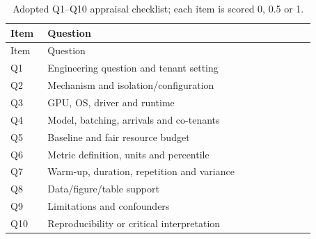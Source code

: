 \begin{longtable}{P{0.1\linewidth}P{0.77\linewidth}}
\caption{Adopted Q1--Q10 appraisal checklist; each item is scored 0, 0.5 or 1.}\\
\toprule Item & Question\\\midrule\endfirsthead
\toprule Item & Question\\\midrule\endhead
Q1 & Engineering question and tenant setting\\
Q2 & Mechanism and isolation/configuration\\
Q3 & GPU, OS, driver and runtime\\
Q4 & Model, batching, arrivals and co-tenants\\
Q5 & Baseline and fair resource budget\\
Q6 & Metric definition, units and percentile\\
Q7 & Warm-up, duration, repetition and variance\\
Q8 & Data/figure/table support\\
Q9 & Limitations and confounders\\
Q10 & Reproducibility or critical interpretation\\
\bottomrule\end{longtable}
